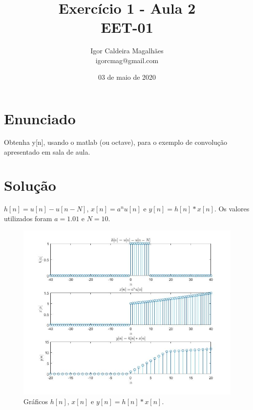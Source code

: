\documentclass[a4paper, 12pt]{article}
\title{Exercício 1 - Aula 2 \\ EET-01}
\author{
  Igor Caldeira Magalhães\\igorcmag@gmail.com
}
\date{03 de maio de 2020}
\begin{document}
\maketitle
\section{Enunciado}

Obtenha y[n], usando o matlab (ou octave), para o exemplo de convolução apresentado em sala de aula.


\section{Solução}

$h[n]=u[n] - u[n - N]$, $x[n]=a^nu[n]$ e $y[n]=h[n]\ast x[n]$. Os valores utilizados foram $a=1.01$ e $N=10$.



\begin{figure}[H]
	\centering
	\includegraphics[scale=0.7]{img1.jpg} 
	\caption{Gráficos $h[n]$, $x[n]$ e $y[n] = h[n]\ast x[n]$.}
	\label{fig:1a}
\end{figure}
\end{document}

